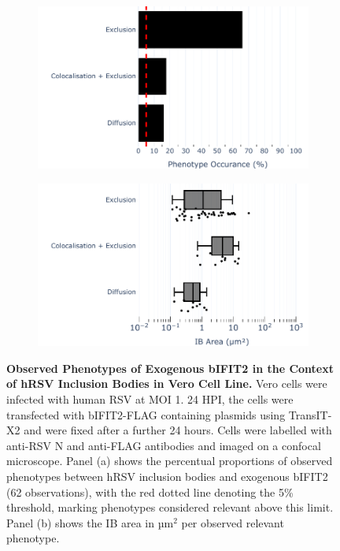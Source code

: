 \begin{figure}
    \begin{subfigure}{0.495\textwidth}
        \caption{}
        \includegraphics[width=1\linewidth]{09. Chapter 4/Figs/02. Overexpression/02. IFIT2/04. bar_bi2f_hrsv.pdf} 
    \end{subfigure}
    \begin{subfigure}{0.495\textwidth}
        \caption{}
        \includegraphics[width=1\linewidth]{09. Chapter 4/Figs/02. Overexpression/02. IFIT2/05. box_bi2f_hrsv.pdf}
    \end{subfigure}
    \caption[Observed Phenotypes of Exogenous bIFIT2 in the Context of hRSV Inclusion Bodies in Vero Cell Line.]{\textbf{Observed Phenotypes of Exogenous bIFIT2 in the Context of hRSV Inclusion Bodies in Vero Cell Line.} Vero cells were infected with human RSV at MOI 1. 24 HPI, the cells were transfected with bIFIT2-FLAG containing plasmids using TransIT-X2 and were fixed after a further 24 hours. Cells were labelled with anti-RSV N and anti-FLAG antibodies and imaged on a confocal microscope. Panel (a) shows the percentual proportions of observed phenotypes between hRSV inclusion bodies and exogenous bIFIT2 (62 observations), with the red dotted line denoting the 5\% threshold, marking phenotypes considered relevant above this limit. Panel (b) shows the IB area in \(\mbox{µm}^2\) per observed relevant phenotype.}
    \label{fig:Observed Phenotypes of Exogenous bIFIT2 in the Context of hRSV Inclusion Bodies in Vero Cell Line}
\end{figure}

